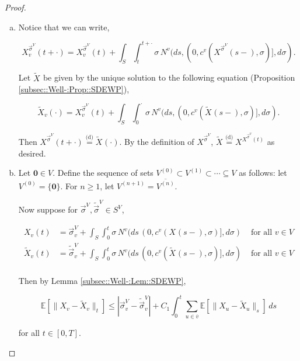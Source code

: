 \documentclass[12pt]{article}
\newcommand{\mb}{\mathbb}
\newcommand{\ov}{\overline}
\newcommand{\te}{\text}
\newcommand{\ind}{\hspace{24pt}}
\newcommand{\ex}[1]{\mb{E}\left[#1\right]}			%
\newcommand{\deq}{\overset{\text{(d)}}{=}}			%
\renewcommand{\root}{\mathbf{0}}				%
\renewcommand{\v}{v}							%
\newcommand{\vv}{u}								%
\renewcommand{\S}{S}							%
\newcommand{\s}{\sigma}							%
\newcommand{\sv}{\vec{\s}}						%
\newcommand{\T}{T}								%
\renewcommand{\t}{t}							%
\renewcommand{\tt}{s}							%
\newcommand{\X}{X}								%
\newcommand{\IGr}{c}							%
\newcommand{\vind}[1]{^{#1}}					%
\newcommand{\carp}[1]{^{#1}}					%
\newcommand{\vsi}[1]{^{#1}}						%
\newcommand{\cind}[1]{_{#1}}					%
\newcommand{\cl}{\ov}							%
\newcommand{\tp}[1]{(#1)}						%
\newcommand{\tip}[1]{#1}						%
\newcommand{\const}{C}							%
\newcommand{\sln}[1]{^{(#1)}}						%
\newcommand{\poiss}{N}							%
\newcommand{\alt}[1]{\widetilde{#1}}			%
\newcommand{\indx}[1]{_{#1}}					%
\newcommand{\pst}[1]{^{#1}}						%
\begin{document}
\begin{proof}
\begin{enumerate}[(a)]
\item Notice that we can write,

\[\X\pst{\sv\cind{}\vsi{V}}\cind{\v}\tp{\t+\cdot} = \X\pst{\sv\cind{}\vsi{V}}\cind{\v}\tp{\t} + \int_\S\int_{\t}^{\t+\cdot} \s\,\poiss\vind{\v}(d\tt,(0,\IGr\vind{\v}(\X\pst{\sv\cind{}\vsi{V}}\cind{}\tp{\tt-},\s)],d\s).\]

Let \(\alt{\X}\cind{}\tip{}\) be given by the unique solution to the following equation (Proposition \ref{subsec::Well-:Prop::SDEWP}),

\[\alt{\X}\cind{\v}\tp{\cdot} = \X\pst{\sv\cind{}\vsi{V}}\cind{\v}\tp{\t} + \int_\S \int_0^\cdot \s\,\poiss\vind{\v}(d\tt,(0,\IGr\vind{\v}(\alt{\X}\cind{}\tp{\tt-},\s)],d\s).\]

Then \(\X\pst{\sv\cind{}\vsi{V}}\cind{}\tp{\t+\cdot} \deq \alt{\X}\cind{}\tp{\cdot}\). By the definition of \(\X\pst{\sv\cind{}\vsi{V}}\cind{}\tip{}\), \(\alt{\X}\cind{}\tip{} \deq \X\pst{\X\pst{\sv\cind{}\vsi{V}}\cind{}\tp{\t}}\cind{}\tip{}\) as desired.

\item Let \(\root \in V\). Define the sequence of sets \(V\sln{0}\subset V\sln{1}\subset \cdots \subseteq V\) as follows: let \(V\sln{0} = \{\root\}\). For \(n \geq 1\), let \(V\sln{n+1} = \cl{V\sln{n}}\).

\ind Now suppose for \(\sv\cind{}\vsi{V},\alt{\sv}\cind{}\vsi{V}\in \S\carp{V}\),

\begin{align*}
\X\cind{\v}\tp{\t} &= \sv\cind{\v}\vsi{V} + \int_\S\int_0^\t \s\,\poiss\vind{\v}(d\tt\,(0,\IGr\vind{\v}(\X\cind{}\tp{\tt-},\s)],d\s)&\te{ for all } \v \in V\\
\alt{\X}\cind{\v}\tp{\t} &= \alt{\sv}\cind{\v}\vsi{V} + \int_\S\int_0^\t \s\,\poiss\vind{\v}(d\tt\,(0,\IGr\vind{\v}(\alt{\X}\cind{}\tp{\tt-},\s)],d\s)&\te{ for all } \v \in V\\
\end{align*}

Then by Lemma \ref{subsec::Well-:Lem::SDEWP},

\[\ex{\|\X\cind{\v}\tip{} - \alt{\X}\cind{\v}\tip{}\|_\t} \leq |\sv\cind{\v}\vsi{V} - \alt{\sv}\cind{\v}\vsi{V}| + \const\indx{1}\int_0^\t \sum_{\vv\in \cl{\v}} \ex{\|\X\cind{\vv}\tip{} - \alt{\X}\cind{\vv}\tip{}\|_\tt}\,d\tt\]

for all \(\t \in [0,\T]\).


\end{enumerate}
\end{proof}
\end{document}
